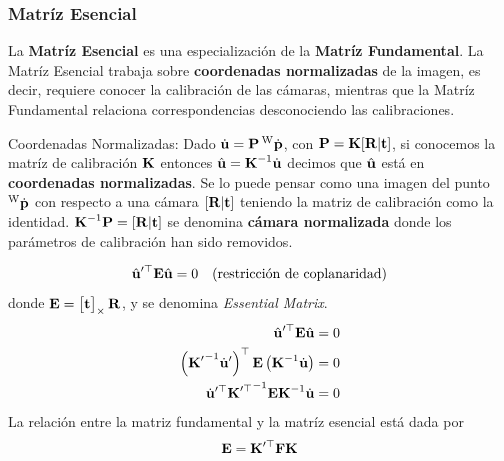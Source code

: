 \begin{frame}
    \frametitle{Matríz Esencial}
    \footnotesize

    La {\bf Matríz Esencial} es una especialización de la {\bf Matríz Fundamental}. La Matríz Esencial trabaja sobre {\bf coordenadas  normalizadas}  de la imagen, es decir, requiere conocer la calibración de las cámaras, mientras que la Matríz Fundamental relaciona correspondencias desconociendo las calibraciones.

    \begin{block}{Coordenadas Normalizadas:}
        Dado $\dot{\boldsymbol{\mathbf{u}}} = \boldsymbol{\mathbf{P}} \prescript{\mathrm{\mathrm{W}}}{}{\dot{\boldsymbol{\mathbf{p}}}}$, con $\boldsymbol{\mathbf{P}} = \boldsymbol{\mathbf{K}} [\boldsymbol{\mathbf{R}}|\boldsymbol{\mathbf{t}}]$, si conocemos la matríz de calibración $\boldsymbol{\mathbf{K}}$ entonces $\hat{\boldsymbol{\mathbf{u}}} = {\boldsymbol{\mathbf{K}}}^{-1} \dot{\boldsymbol{\mathbf{u}}}$ decimos que $\hat{\boldsymbol{\mathbf{u}}}$ está en {\bf coordenadas normalizadas}. Se lo puede pensar como una imagen del punto $\prescript{\mathrm{\mathrm{W}}}{}{\dot{\boldsymbol{\mathbf{p}}}}$ con respecto a una cámara $[\boldsymbol{\mathbf{R}}|\boldsymbol{\mathbf{t}}]$ teniendo la matriz de calibración como la identidad. $ {\boldsymbol{\mathbf{K}}}^{-1} \boldsymbol{\mathbf{P}} = [\boldsymbol{\mathbf{R}}| \boldsymbol{\mathbf{t}}]$ se denomina {\bf cámara normalizada} donde los parámetros de calibración han sido removidos.
    \end{block}
%
    \begin{equation*}
        \hat{\boldsymbol{\mathbf{u}}}^{\prime\top} \boldsymbol{\mathbf{E}} \hat{\boldsymbol{\mathbf{u}}}  = 0 \quad \text{(restricción de coplanaridad)}
    \end{equation*}
    donde $\boldsymbol{\mathbf{E}} = \begin{bmatrix}
        \boldsymbol{\mathbf{t}} 
    \end{bmatrix}_{\times} \boldsymbol{\mathbf{R}}$, y se denomina \emph{Essential Matrix}.
%
    \begin{align*}
        \hat{\boldsymbol{\mathbf{u}}}^{\prime\top} \boldsymbol{\mathbf{E}} \hat{\boldsymbol{\mathbf{u}}}  &= 0\\
        \left( {\boldsymbol{\mathbf{K}}^{\prime}}^{-1} \dot{\boldsymbol{\mathbf{u}}}^{\prime} \right)^{\top} \boldsymbol{\mathbf{E}} \left( {\boldsymbol{\mathbf{K}}}^{-1} \dot{\boldsymbol{\mathbf{u}}} \right) &= 0\\
        \dot{\boldsymbol{\mathbf{u}}}^{\prime\top} {\boldsymbol{\mathbf{K}}^{\prime\top}}^{-1} \boldsymbol{\mathbf{E}} {\boldsymbol{\mathbf{K}}}^{-1} \dot{\boldsymbol{\mathbf{u}}}&= 0
    \end{align*}
    La relación entre la matriz fundamental y la matríz esencial está dada por
    \begin{equation*}
        \boldsymbol{\mathbf{E}} = \boldsymbol{\mathbf{K}}^{\prime\top} \boldsymbol{\mathbf{F}} \boldsymbol{\mathbf{K}}
    \end{equation*}

    
\end{frame}

